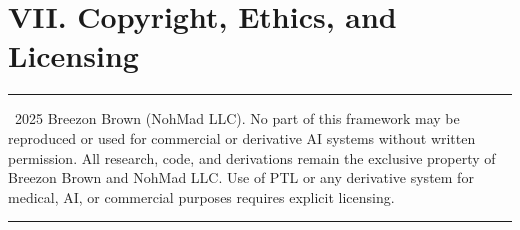 \documentclass[12pt]{article}
\begin{document}
\section*{VII. Copyright, Ethics, and Licensing}
\vspace{-1em}
\hrule
\smallskip
\textcopyright\, 2025 Breezon Brown (NohMad LLC).  
No part of this framework may be reproduced or used for commercial or derivative AI systems without written permission.  
All research, code, and derivations remain the exclusive property of Breezon Brown and NohMad LLC.  
Use of PTL or any derivative system for medical, AI, or commercial purposes requires explicit licensing.
\hrule
\end{document}
